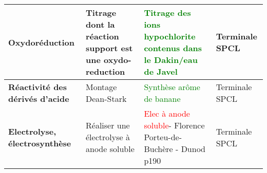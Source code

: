 \begin{changemargin}{-1.5cm}{0cm}
\begin{tabularx}{\paperwidth-2cm}{| X | X | X | X |}
  \hline
  \textbf{Oxydoréduction} & Titrage dont la réaction support est une oxydo-reduction & \textcolor{green}{Titrage des ions hypochlorite contenus dans le Dakin/eau de Javel}  & Terminale SPCL \\
  \hline
  \textbf{Réactivité des dérivés d'acide} & Montage Dean-Stark & \textcolor{green}{Synthèse arôme de banane}  & Terminale SPCL \\
  \hline
  \textbf{Electrolyse, électrosynthèse} & Réaliser une électrolyse à anode soluble & \textcolor{red}{Elec à anode soluble}- Florence Porteu-de-Buchère - Dunod p190 & Terminale SPCL \\
  \hline
\end{tabularx}
\end{changemargin}

\newpage
\begin{changemargin}{-1.5cm}{-0cm}
    

\end{changemargin}
